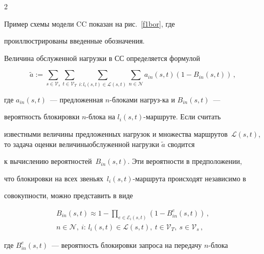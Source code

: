 \begin{multicols}{2}





Пример схемы модели CC показан на рис.~\ref{f1bor}, где 


проиллюстрированы введенные обозначения.





 


  Величина обслуженной нагрузки в СС определяется формулой


  $$


  \tilde{a} := \sum\limits_{s\in {\mathcal V}_s }\sum\limits_{t\in {\mathcal V}_T} 


\sum\limits_{i:l_i(s,t)\in {\mathcal L}(s,t)} \sum\limits_{n\in {\mathcal N}} 


a_{in}(s,t) (1- B_{in}(s,t))\,,


  $$


  где $a_{in}(s,t)$~--- предложенная $n$-блоками нагруз-\linebreak ка и $B_{in}(s,t)$~--- 


вероятность блокировки $n$-блока на $l_i(s,t)$-маршруте. Если считать 


известными ве\-личины предложенных нагрузок и множества маршрутов~${\mathcal 


L}(s,t)$, то задача оценки величины\linebreak обслуженной нагрузки $\tilde{a}$ сводится 


к вычислению вероятностей~$B_{in}(s,t)$. Эти вероятности в предположении, 


что блокировки на всех звеньях~$l_i(s,t)$-маршрута происходят независимо в 


совокупности, можно представить в виде





\noindent


\begin{multline*}


B_{in} (s,t)\approx 1- \prod_{e\in {\mathcal E}_i(s,t)} \left ( 1-B_{in}^e (s,t)\right)\,,\\


n\in {\mathcal N},\ i\mbox{:\ }l_i(s,t)\in {\mathcal L}(s,t),\ t\in{\mathcal V}_T,\ s\in {\mathcal V}_s\,,


\end{multline*}


где $B_{in}^e(s,t)$~--- вероятность блокировки запроса на передачу $n$-блока 



\end{multicols}
